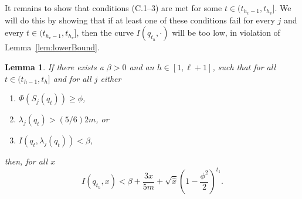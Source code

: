 \documentclass[11pt]{article}
\newtheorem{lemma}[theorem]{Lemma}
\newcommand{\setj}[2]{S_{#1} (#2)}
\newcommand{\lamj}[2]{\lambda_{#1} (#2)}
\begin{document}
It remains to show that conditions (C.1--3) are met for some
  $t \in (t_{h_{v}-1}, t_{h_{v}}]$.
We will do this by showing that if at least one of these
  conditions fail for every $j$ and every
  $t \in (t_{h_{v}-1}, t_{h_{v}}]$,
  then the curve $I (q_{t_{h}}, \cdot)$ will be too low, in violation
  of Lemma~\ref{lem:lowerBound}.

\begin{lemma}\label{lem:C1help}
If there exists a $\beta > 0$ and an
 $h \in [1,\ell + 1]$, 
  such that for all
  $t \in (t_{h-1}, t_{h}]$ and for all $j$
  either
\begin{enumerate}
\item [1.]  $\Phi (\setj{j}{q_{t}}) \geq \phi$,
\item [2.] $\lamj{j}{q_{t}} > (5/6) 2m$, or
\item [3.] $I (q_{t}, \lamj{j}{q_{t}}) < \beta $, 
\end{enumerate}
then, for all $x$
\[
  I (q_{t_{h}}, x)
<
  \beta + \frac{3 x}{5 m}
+
  \sqrt{\widehat{x}} \left(1 - \frac{\phi^{2}}{2} \right)^{t_{1}}.
\]
\end{lemma}
\end{document}
